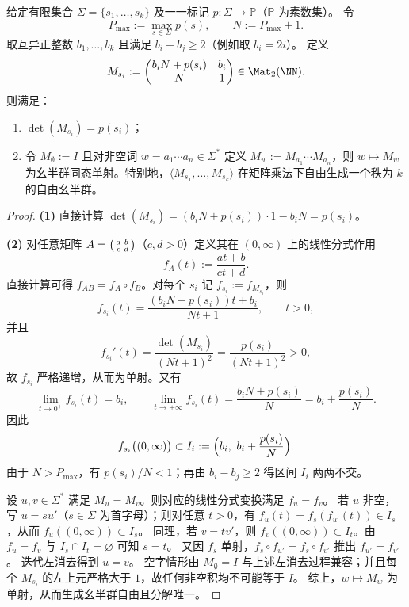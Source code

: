\begin{theorem}\label{thm:pom-prime-determinant-2x2-free-encoding}
给定有限集合 \(\Sigma=\{s_1,\dots,s_k\}\) 及一一标记 \(p:\Sigma\to\mathbb{P}\)（\(\mathbb{P}\) 为素数集）。
令
\[
P_{\max}:=\max_{s\in\Sigma}p(s),\qquad N:=P_{\max}+1.
\]
取互异正整数 \(b_1,\dots,b_k\) 且满足 \(b_i-b_j\ge 2\)（例如取 \(b_i=2i\)）。
定义
\[
M_{s_i}:=
\begin{pmatrix}
b_iN+p(s_i) & b_i\\
N & 1
\end{pmatrix}\in\Mat_{2}(\NN).
\]
则满足：
\begin{enumerate}
  \item \(\det(M_{s_i})=p(s_i)\)；
  \item 令 \(M_{\emptyset}:=I\) 且对非空词 \(w=a_1\cdots a_n\in\Sigma^{*}\) 定义 \(M_w:=M_{a_1}\cdots M_{a_n}\)，则 \(w\mapsto M_w\) 为幺半群同态单射。特别地，\(\langle M_{s_1},\dots,M_{s_k}\rangle\) 在矩阵乘法下自由生成一个秩为 \(k\) 的自由幺半群。
\end{enumerate}
\end{theorem}
\begin{proof}
\textbf{(1)} 直接计算
\(
\det(M_{s_i})=(b_iN+p(s_i))\cdot 1-b_iN=p(s_i)
\)。
\par
\textbf{(2)} 对任意矩阵 \(A=\begin{psmallmatrix}a&b\\ c&d\end{psmallmatrix}\)（\(c,d>0\)）定义其在 \((0,\infty)\) 上的线性分式作用
\[
f_A(t):=\frac{at+b}{ct+d}.
\]
直接计算可得 \(f_{AB}=f_A\circ f_B\)。对每个 \(s_i\) 记 \(f_{s_i}:=f_{M_{s_i}}\)，则
\[
f_{s_i}(t)=\frac{(b_iN+p(s_i))t+b_i}{Nt+1},\qquad t>0,
\]
并且
\[
f_{s_i}'(t)=\frac{\det(M_{s_i})}{(Nt+1)^2}=\frac{p(s_i)}{(Nt+1)^2}>0,
\]
故 \(f_{s_i}\) 严格递增，从而为单射。又有
\[
\lim_{t\to 0^+}f_{s_i}(t)=b_i,\qquad \lim_{t\to +\infty}f_{s_i}(t)=\frac{b_iN+p(s_i)}{N}=b_i+\frac{p(s_i)}{N}.
\]
因此
\[
f_{s_i}\bigl((0,\infty)\bigr)\subset I_i:=\Bigl(b_i,\ b_i+\frac{p(s_i)}{N}\Bigr).
\]
由于 \(N>P_{\max}\)，有 \(p(s_i)/N<1\)；再由 \(b_i-b_j\ge 2\) 得区间 \(I_i\) 两两不交。
\par
设 \(u,v\in\Sigma^{*}\) 满足 \(M_u=M_v\)。则对应的线性分式变换满足 \(f_u=f_v\)。
若 \(u\) 非空，写 \(u=su'\)（\(s\in\Sigma\) 为首字母）；则对任意 \(t>0\)，有 \(f_{u}(t)=f_s(f_{u'}(t))\in I_s\)，从而 \(f_u((0,\infty))\subset I_s\)。
同理，若 \(v=tv'\)，则 \(f_v((0,\infty))\subset I_t\)。由 \(f_u=f_v\) 与 \(I_s\cap I_t=\varnothing\) 可知 \(s=t\)。
又因 \(f_s\) 单射，\(f_s\circ f_{u'}=f_s\circ f_{v'}\) 推出 \(f_{u'}=f_{v'}\)。
迭代左消去得到 \(u=v\)。
空字情形由 \(M_{\emptyset}=I\) 与上述左消去过程兼容；并且每个 \(M_{s_i}\) 的左上元严格大于 \(1\)，故任何非空积均不可能等于 \(I\)。
综上，\(w\mapsto M_w\) 为单射，从而生成幺半群自由且分解唯一。
\end{proof}

